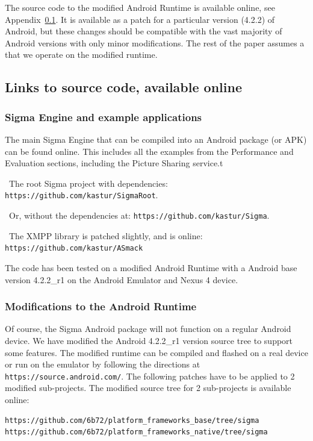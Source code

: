 \documentclass[prodmode]{acmlarge}
\begin{document}
The source code to the modified Android Runtime is available online, see Appendix~\ref{app:SourceCode}. It is available as a patch for a particular version (4.2.2) of Android, but these changes should be compatible with the vast majority of Android versions with only minor modifications. The rest of the paper assumes a that we operate on the modified runtime.

\subsection{Links to source code, available online}
\label{app:SourceCode}

\subsubsection{Sigma Engine and example applications}
The main Sigma Engine that can be compiled into an Android package (or APK) can be found online. This includes all the examples from the Performance and Evaluation sections, including the Picture Sharing service.t

\noindent~The root Sigma project with dependencies: \verb|https://github.com/kastur/SigmaRoot|.

\noindent~Or, without the dependencies at: \verb|https://github.com/kastur/Sigma|.

\noindent~The XMPP library is patched slightly, and is online: \verb|https://github.com/kastur/ASmack|

The code has been tested on a modified Android Runtime with a Android base version 4.2.2\_r1 on the Android Emulator and Nexus 4 device.

\subsubsection{Modifications to the Android Runtime}
Of course, the Sigma Android package will not function on a regular Android device. We have modified the Android 4.2.2\_r1 version source tree to support some features. The modified runtime can be compiled and flashed on a real device or run on the emulator by following the directions at \verb|https://source.android.com/|. The following patches have to be applied to 2 modified sub-projects. The modified source tree for 2 sub-projects is available online:

\begin{Verbatim}
https://github.com/6b72/platform_frameworks_base/tree/sigma
https://github.com/6b72/platform_frameworks_native/tree/sigma
\end{Verbatim}
\end{document}

